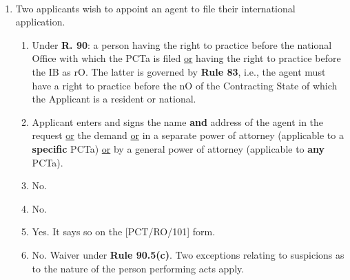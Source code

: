 \documentclass{report}
\newcommand{\p}{\adforn{61} \ }
\begin{document}
\begin{center}

\p \p \p
 
\end{center}

\begin{enumerate}[label=\textbf{Answer \arabic*}]

    \item %
    Two applicants wish to appoint an agent to file their international application.
    \begin{enumerate}[label=(\alph*)]
        \item Under \textbf{R. 90}: a person having the right to practice before the national Office with which the PCTa is filed \underline{or} having the right to practice before the IB as rO. The latter is governed by \textbf{Rule 83}, i.e., the agent must have a right to practice before the nO of the Contracting State of which the Applicant is a resident or national.
        \item Applicant enters and signs the name \textbf{and} address of the agent in the request \underline{or} the demand \underline{or} in a separate power of attorney (applicable to a \textbf{specific} PCTa) \underline{or} by a general power of attorney (applicable to \textbf{any} PCTa).
        \item No.
        \item No.

        \item Yes. It says so on the \textsc{[PCT/RO/101]} form.
        \item No. Waiver under \textbf{Rule 90.5(c)}. Two exceptions relating to suspicions as to the nature of the person performing acts apply.
    \end{enumerate}


\end{enumerate}
\end{document}
